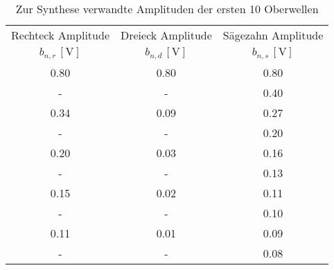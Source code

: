 \begin{table}[!h]
	\centering
	\begin{tabular}{|c|c|c|}
		\hline
		  Rechteck Amplitude    &    Dreieck Amplitude    &   Sägezahn Amplitude    \\
		$b_{n,r}\,[\si{\volt}]$ & $b_{n,d}\,[\si{\volt}]$ & $b_{n,s}\,[\si{\volt}]$ \\ \hline\hline
		      \num{0.80}        &       \num{0.80}        &       \num{0.80}        \\
		           -            &            -            &       \num{0.40}        \\
		      \num{0.34}        &       \num{0.09}        &       \num{0.27}        \\
		           -            &            -            &       \num{0.20}        \\
		      \num{0.20}        &       \num{0.03}        &       \num{0.16}        \\
		           -            &            -            &       \num{0.13}        \\
		      \num{0.15}        &       \num{0.02}        &       \num{0.11}        \\
		           -            &            -            &       \num{0.10}        \\
		      \num{0.11}        &       \num{0.01}        &       \num{0.09}        \\
		           -            &            -            &       \num{0.08}        \\ \hline
	\end{tabular}
	\caption{Zur Synthese verwandte Amplituden der ersten 10 Oberwellen \label{tab:Synthese}}
\end{table}